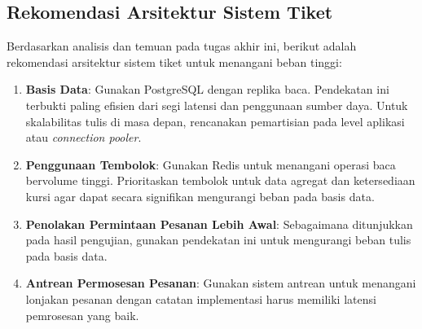\subsection{Rekomendasi Arsitektur Sistem Tiket}
\label{rekomendasi-arsitektur}

Berdasarkan analisis dan temuan pada tugas akhir ini, berikut adalah rekomendasi arsitektur sistem tiket untuk menangani beban tinggi:

\begin{enumerate}
    \item \textbf{Basis Data}: Gunakan PostgreSQL dengan replika baca. Pendekatan ini terbukti paling efisien dari segi latensi dan penggunaan sumber daya. Untuk skalabilitas tulis di masa depan, rencanakan pemartisian pada level aplikasi atau \textit{connection pooler}.

    \item \textbf{Penggunaan Tembolok}: Gunakan Redis untuk menangani operasi baca bervolume tinggi. Prioritaskan tembolok untuk data agregat dan ketersediaan kursi agar dapat secara signifikan mengurangi beban pada basis data.

    \item \textbf{Penolakan Permintaan Pesanan Lebih Awal}: Sebagaimana ditunjukkan pada hasil pengujian, gunakan pendekatan ini untuk mengurangi beban tulis pada basis data.

    \item \textbf{Antrean Permosesan Pesanan}: Gunakan sistem antrean untuk menangani lonjakan pesanan dengan catatan implementasi harus memiliki latensi pemrosesan yang baik.
\end{enumerate}
